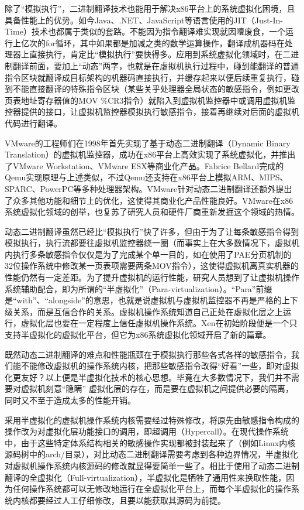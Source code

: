 除了``模拟执行''，二进制翻译技术也能用于解决x86平台上的系统虚拟化困境，且具备性能上的优势。如今Java、.NET、JavaScript等语言使用的JIT（Just-In-Time）技术也都属于类似的套路。不能因为指令翻译难实现就因噎废食，一个运行上亿次的for循环，其中如果都是加减之类的数学运算操作，翻译成机器码在处理器上直接执行，肯定比``模拟执行''要快得多。应用到系统虚拟化领域时，在二进制翻译前面，要加上``动态''两字，也就是在虚拟机执行过程中，碰到能翻译的普通指令区块就翻译成目标架构的机器码直接执行，并缓存起来以便后续重复执行，碰到不能直接翻译的特殊指令区块（某些关乎处理器全局状态的敏感指令，例如更改页表地址寄存器值的MOV \%CR3指令）就陷入到虚拟机监控器中或调用虚拟机监控器提供的接口，让虚拟机监控器模拟执行敏感指令，接着再继续对后面的虚拟机代码进行翻译。

VMware的工程师们在1998年首先实现了基于动态二进制翻译（Dynamic Binary Translation）的虚拟机监控器，成功在x86平台上高效实现了系统虚拟化，并推出了VMware Workstation、VMware ESX等商业化产品\cite{agesen2010evolution}。Fabrice Bellard完成的Qemu实现原理与上述类似，不过Qemu还支持在x86平台上模拟ARM、MIPS、SPARC、PowerPC等多种处理器架构。VMware针对动态二进制翻译还额外提出了众多其他功能和细节上的优化，这使得其商业化产品性能良好。VMware在x86系统虚拟化领域的创举，也复苏了研究人员和硬件厂商重新发掘这个领域的热情。

动态二进制翻译虽然已经比``模拟执行''快了许多，但由于为了让每条敏感指令得到模拟执行，执行流都要往虚拟机监控器绕一圈（而事实上在大多数情况下，虚拟机内执行多条敏感指令仅仅是为了完成某个单一目的，如在使用了PAE分页机制的32位操作系统中修改某一页表项需要两条MOV指令），这使得虚拟机离真实机器的性能仍然有一定差距。为了提升虚拟机的运行性能，研究人员想到了让虚拟机操作系统辅助配合，即为所谓的``半虚拟化''（Para-virtualization）。``Para''前缀是``with''、``alongside''的意思，也就是说虚拟机与虚拟机监控器不再是严格的上下级关系，而是互信合作的关系。虚拟机操作系统知道自己正处在虚拟化层之上运行，虚拟化层也要在一定程度上信任虚拟机操作系统。Xen在初始阶段便是一个只支持半虚拟化的虚拟化平台，但它为x86系统虚拟化领域开启了新的篇章。

既然动态二进制翻译的难点和性能瓶颈在于模拟执行那些各式各样的敏感指令，我们能不能修改虚拟机的操作系统内核，把那些敏感指令改得``好看''一些，即对虚拟化更友好？以上便是半虚拟化技术的核心思想。毕竟在大多数情况下，我们并不需要对虚拟机刻意``隐瞒'' 虚拟化层的存在，而是要在虚拟机之间提供必要的隔离，同时又不至于造成太多的性能开销。

采用半虚拟化的虚拟机操作系统内核需要经过特殊修改，将原先由敏感指令构成的操作改为对虚拟化层功能接口的调用，即超调用（Hypercall）。在现代操作系统中，由于这些特定体系结构相关的敏感操作实现都被封装起来了（例如Linux内核源码树中的arch/目录），对比动态二进制翻译需要考虑到各种边界情况，半虚拟化对虚拟机操作系统内核源码的修改就显得要简单一些了。相比于使用了动态二进制翻译的全虚拟化（Full-virtualization），半虚拟化是牺牲了通用性来换取性能，因为任何操作系统都可以无修改地运行在全虚拟化平台上，而每个半虚拟化的操作系统内核都要经过人工仔细修改，且要以能获取其源码为前提\cite{barham2003xen}\cite{bugnion1997disco}。

